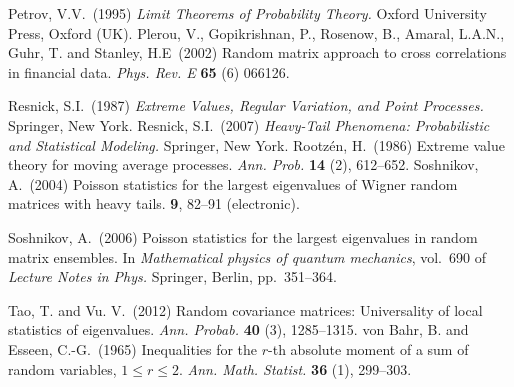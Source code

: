 \documentclass[leqno,10pt]{amsart}
\newcommand{\1}{{\bf 1}}
\newcommand{\8}{\infty}
\begin{document}
\begin{thebibliography}{99}
{\sc Petrov, V.V.}\ (1995)
{\em Limit Theorems of Probability Theory.} Oxford University Press, Oxford (UK).
{\sc Plerou, V., Gopikrishnan, P., Rosenow, B., Amaral, L.A.N., Guhr, T. and Stanley, H.E}\ (2002)
Random matrix approach to cross correlations in financial data. {\em Phys. Rev. E} {\bf 65} (6) 066126. 

{\sc Resnick, S.I.}\ (1987) {\em Extreme Values, Regular Variation,
and Point Processes.} Sprin\-ger, New York.
{\sc Resnick, S.I.}\ (2007)
{\em Heavy-Tail Phenomena: Probabilistic and Statistical Modeling.}
Springer, New York.
{\sc Rootz\'{e}n, H.}\ (1986) Extreme value theory for moving average processes. {\em Ann. Prob.} {\bf 14} (2),  612--652.
{\sc Soshnikov, A.}\ (2004)
\newblock Poisson statistics for the largest eigenvalues of {W}igner random
  matrices with heavy tails.
 \textbf{9}, 82--91 (electronic).

{\sc Soshnikov, A.}\ (2006)
\newblock Poisson statistics for the largest eigenvalues in random matrix
  ensembles.
\newblock In {\em Mathematical physics of quantum mechanics}, vol.~690 of {\em
  Lecture Notes in Phys.} Springer, Berlin, pp.~351--364.

{\sc Tao, T. and Vu. V.}\ (2012)
Random covariance matrices: Universality of local statistics of eigenvalues.
{\em Ann. Probab.} {\bf 40} (3), 1285--1315.
{\sc von Bahr, B. and Esseen, C.-G.}\ (1965) Inequalities for the $r$-th absolute moment of a sum of random variables, $1\leq r \leq 2$. {\em Ann. Math. Statist.} {\bf 36} (1),  299--303.

\end{thebibliography}
\end{document}
